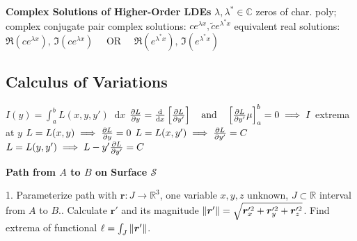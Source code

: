 \documentclass[10pt, a4paper]{article}
\newcommand*\diff{\mathop{}\!\mathrm{d}} %
\newcommand{\R}{\mathbb{R}} %
\begin{document}
\begin{multicols}{2}
\textbf{Complex Solutions of Higher-Order LDEs}\newline
$ \lambda, \lambda^* \in \mathbb{C} $ zeros of char. poly; complex conjugate pair \newline
complex solutions: $ c e^{\lambda x}, \tilde{c} e^{\lambda^* x} $  \newline
equivalent real solutions: \newline
$ \Re(c e^{\lambda x}), \, \Im(c e^{\lambda x}) \quad $ OR $ \quad \Re(e^{\lambda^* x}), \, \Im(e^{\lambda^* x}) $

\vspace{-5mm}
\subsection*{Calculus of Variations}
$ I(y) = \int_{a}^{b} L(x, y, y') \diff x $ \newline
$ \pdv{L}{y} = \dv{}{x} \left[\pdv{L}{y'} \right] \quad \text{and} \quad \left[\pdv{L}{y'} \mu \right]^{b}_{a} = 0 \implies I $ extrema at $ y $ \vspace{1mm} \newline
$ L = L(x, y) \implies \pdv{L}{y} = 0 $ \newline 
$ L = L(x, y') \implies \pdv{L}{y'} = C $ \newline 
$ L = L(y, y') \implies L - y' \pdv{L}{y'} = C $

\textbf{Path from $ A $ to $ B $ on Surface $ \mathcal{S} $}

1. Parameterize path with $ \bm{r} : J \to \R^3 $, one variable $ x, y, z $ unknown, $ J \subset \R $ interval from $ A $ to $ B $.. Calculate $ \bm{r}' $ and its magnitude $ \norm{\bm{r}'} = \sqrt{\bm{r}_x'^2 + \bm{r}_y'^2 +  \bm{r}_z'^2}$. Find extrema of functional $ \ell = \int_J \norm{\bm{r}'} $.

\end{multicols}
\end{document}
